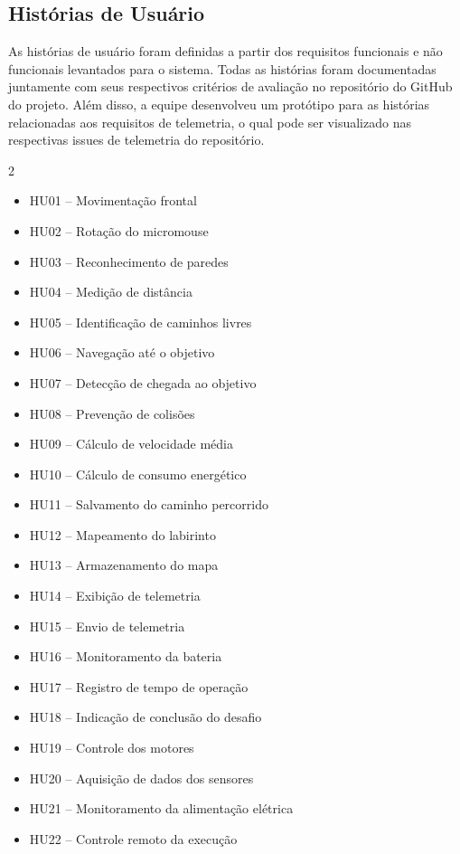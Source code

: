     \subsection{Histórias de Usuário}
      As histórias de usuário foram definidas a partir dos requisitos funcionais e não funcionais levantados para o sistema. Todas as histórias foram documentadas juntamente com seus respectivos critérios de avaliação no repositório do GitHub do projeto. Além disso, a equipe desenvolveu um protótipo para as histórias relacionadas aos requisitos de telemetria, o qual pode ser visualizado nas respectivas issues de telemetria do repositório.
    \begin{center}

    \begin{multicols}{2}
    \begin{itemize}
        \item HU01 -- Movimentação frontal
        \item HU02 -- Rotação do micromouse
        \item HU03 -- Reconhecimento de paredes
        \item HU04 -- Medição de distância
        \item HU05 -- Identificação de caminhos livres
        \item HU06 -- Navegação até o objetivo
        \item HU07 -- Detecção de chegada ao objetivo
        \item HU08 -- Prevenção de colisões
        \item HU09 -- Cálculo de velocidade média
        \item HU10 -- Cálculo de consumo energético
        \item HU11 -- Salvamento do caminho percorrido
        \item HU12 -- Mapeamento do labirinto
        \item HU13 -- Armazenamento do mapa
        \item HU14 -- Exibição de telemetria
        \item HU15 -- Envio de telemetria
        \item HU16 -- Monitoramento da bateria
        \item HU17 -- Registro de tempo de operação
        \item HU18 -- Indicação de conclusão do desafio
        \item HU19 -- Controle dos motores
        \item HU20 -- Aquisição de dados dos sensores
        \item HU21 -- Monitoramento da alimentação elétrica
        \item HU22 -- Controle remoto da execução
    \end{itemize}
    \end{multicols}        
    \end{center}




